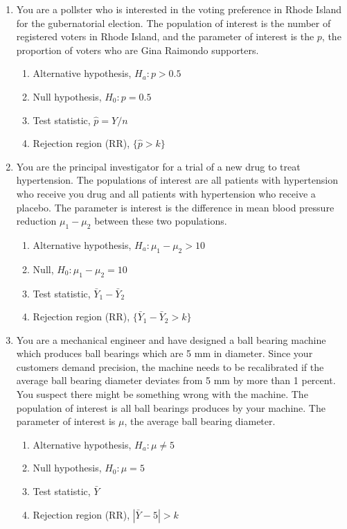\documentclass[notes.tex]{subfiles}
\begin{document}
\begin{enumerate}
\item You are a pollster who is interested in the voting preference in Rhode Island for the gubernatorial election. The population of interest is the number of registered voters in Rhode Island, and the parameter of interest is the $p$, the proportion of voters who are Gina Raimondo supporters.
\begin{enumerate}
\item Alternative hypothesis, $H_a: p > 0.5$
\item Null hypothesis, $H_0: p = 0.5$
\item Test statistic, $\hat{p} = Y / n$
\item Rejection region (RR), $\{\hat{p} > k\}$
\end{enumerate}

\item You are the principal investigator for a trial of a new drug to treat hypertension. The populations of interest are all patients with hypertension who receive you drug and all patients with hypertension who receive a placebo. The parameter is interest is the difference in mean blood pressure reduction $\mu_1 - \mu_2$ between these two populations.
\begin{enumerate}
\item Alternative hypothesis, $H_a: \mu_1 - \mu_2 > 10$
\item Null, $H_0: \mu_1 - \mu_2 = 10$
\item Test statistic, $\bar{Y}_1 - \bar{Y}_2$
\item Rejection region (RR), $\{\bar{Y}_1 - \bar{Y}_2 > k\}$
\end{enumerate}

\item You are a mechanical engineer and have designed a ball bearing machine which produces ball bearings which are 5 mm in diameter. Since your customers demand precision, the machine needs to be recalibrated if the average ball bearing diameter deviates from 5 mm by more than 1 percent. You suspect there might be something wrong with the machine. The population of interest is all ball bearings produces by your machine. The parameter of interest is $\mu$, the average ball bearing diameter.
\begin{enumerate}
\item Alternative hypothesis, $H_a: \mu \neq 5$
\item Null hypothesis, $H_0: \mu = 5$
\item Test statistic, $\bar{Y}$
\item Rejection region (RR), $|\bar{Y} - 5| > k$
\end{enumerate}

\end{enumerate}
\end{document}
